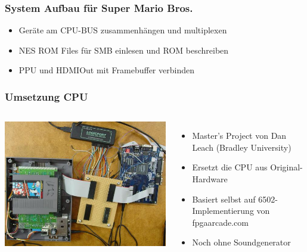 \documentclass{beamer}
\begin{document}
    \begin{frame}
        \frametitle{System Aufbau für Super Mario Bros.}
        \begin{itemize}
            \item{Geräte am CPU-BUS zusammenhängen und multiplexen}
            \item{NES ROM Files für SMB einlesen und ROM beschreiben}
            \item{PPU und HDMIOut mit Framebuffer verbinden}
        \end{itemize}
    \end{frame}
    
        
    \begin{frame}
        \frametitle{Umsetzung CPU} 
        \begin{columns}
                \includegraphics[width=1.1\textwidth]{img/danleach.jpg}
                \begin{itemize}
                    \item{Master's Project von Dan Leach (Bradley University)}
                    \item{Ersetzt die CPU aus Original-Hardware}
                    \item{Basiert selbst auf 6502-Implementierung von fpgaarcade.com}
                    \item{Noch ohne Soundgenerator}
                \end{itemize}
        \end{columns}
    \end{frame}
    
\end{document}
